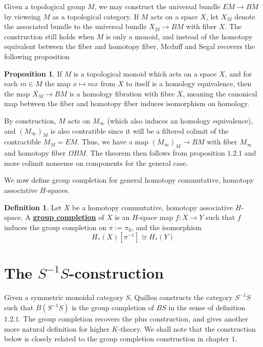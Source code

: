 \documentclass{article}
\theoremstyle{definition}
\theoremstyle{definition}
\newtheorem{definition}{Definition}[theorem]
\theoremstyle{definition}
\theoremstyle{definition}
\newtheorem{proposition}{Proposition}[theorem]
\theoremstyle{definition}
\theoremstyle{definition}
\theoremstyle{definition}
\begin{document}
Given a topological group $M$, we may construct the universal bundle $EM\to BM$ by vieweing $M$ as a topological category. If $M$ acts on a space $X$, let $X_M$ denote the associated bundle to the universal bundle $X_M\to BM$ with fiber $X$. The construction still holds when $M$ is only a monoid, and instead of the homotopy equivalent between the fiber and homotopy fiber, Mcduff and Segal recovers the following proposition
\begin{tcolorbox}[colback=blue!5!white,colframe=blue!30!white]
    \begin{proposition}
        If $M$ is a topological monoid which acts on a space $X$, and for each $m\in M$ the map $x\mapsto mx$ from $X$ to itself is a homology equivalence, then the map $X_M\to BM$ is a homology fibration with fibre $X$, meaning the canonical map between the fiber and homotopy fiber induces isomorphism on homology.
    \end{proposition}
    \end{tcolorbox}



By construction, $M$ acts on $M_{\infty}$ (which also induces an homology equivalence), and $(M_{\infty})_M$ is also contratible since it will be a filtered colimit of the contractible $M_M=EM$. Thus, we have a map $(M_{\infty})_{M} \to BM$ with fiber $M_{\infty}$ and homotopy fiber $\Omega BM$. The theorem then follows from proposition $1.2.1$ and more colimit nonsense on components for the general case. 


We now define group completion for general homotopy commutative, homotopy associative $H$-spaces.

\begin{tcolorbox}[colback=purple!5!white,colframe=purple!75!black]
\begin{definition}
Let $X$ be a homotopy commutative, homotopy associative $H$-space. A \underline{\textbf{group completion}} of $X$ is an $H$-space map $f: X\to Y$ such that $f$ induces the group completion on $\pi:=\pi_0$, and the isomorphism
\[H_*(X)[\pi^{-1}]\cong H_*(Y)\] 

\end{definition}
\end{tcolorbox}


\section{The $S^{-1}S$-construction}
Given a symmetric monoidal category $S$, Quillen constructs the category $S^{-1}S$ such that $B(S^{-1}S)$ is the group completion of $BS$ in the sense of definition $1.2.1$. The group completion recovers the plus construction, and gives another more natural definition for higher $K$-theory. We shall note that the construction below is closely related to the group completion construction in chapter $1$.
\end{document}
